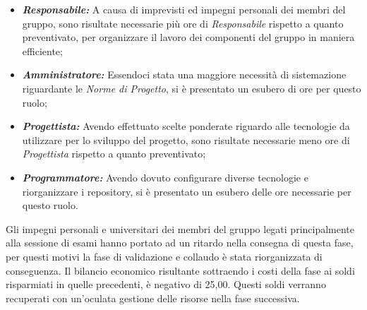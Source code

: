 \begin{itemize}
    \item \textbf{\textit{Responsabile:}} A causa di imprevisti ed impegni personali dei membri del gruppo, sono risultate necessarie più ore di \textit{Responsabile} rispetto a quanto preventivato, per organizzare il lavoro dei componenti del gruppo in maniera efficiente;
    \item \textbf{\textit{Amministratore:}} Essendoci stata una maggiore necessità di sistemazione riguardante le \textit{Norme di Progetto}, si è presentato un esubero di ore per questo ruolo;
    \item \textbf{\textit{Progettista:}} Avendo effettuato scelte ponderate riguardo alle tecnologie da utilizzare per lo sviluppo del progetto, sono risultate necessarie meno ore di \textit{Progettista} rispetto a quanto preventivato;
    \item \textbf{\textit{Programmatore:}} Avendo dovuto configurare diverse tecnologie e riorganizzare i repository, si è presentato un esubero delle ore necessarie per questo ruolo.
\end{itemize}
Gli impegni personali e universitari dei membri del gruppo legati principalmente alla sessione di esami hanno portato ad un ritardo nella consegna di questa fase, per questi motivi la fase di validazione e collaudo è stata riorganizzata di conseguenza.
Il bilancio economico risultante sottraendo i costi della fase ai soldi risparmiati in quelle precedenti, è negativo di 25,00\EURdig. Questi soldi verranno recuperati con un'oculata gestione delle risorse nella fase successiva.